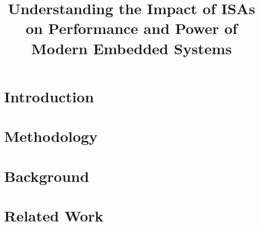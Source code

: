 \documentclass{sig-alternate}
\title{Understanding the Impact of ISAs on Performance and Power of Modern Embedded Systems}
\begin{document}
\maketitle
\thispagestyle{firstpage}
\pagestyle{plain}




\begin{abstract}

  

\end{abstract}

\section{Introduction}


\section{Methodology}
%

\section{Background}


\section{Related Work}





\end{document}
